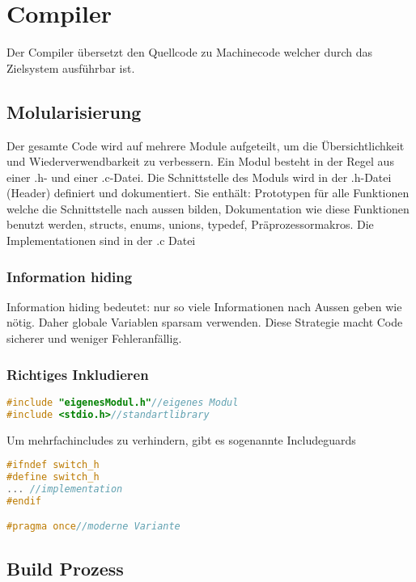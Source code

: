 \section{Compiler}
Der Compiler übersetzt den Quellcode zu Machinecode welcher durch das Zielsystem ausführbar ist.
\subsection{Molularisierung}

Der gesamte Code wird auf mehrere Module aufgeteilt, um die Übersichtlichkeit und Wiederverwendbarkeit zu verbessern. Ein Modul besteht in der Regel aus einer .h- und einer .c-Datei.\newline
Die Schnittstelle des Moduls wird in der .h-Datei (Header) definiert und dokumentiert. Sie enthält: Prototypen für alle Funktionen welche die Schnittstelle nach aussen bilden, Dokumentation wie diese Funktionen benutzt werden, structs, enums, unions, typedef, Präprozessormakros. Die Implementationen sind in der .c Datei

\subsubsection{Information hiding}

Information hiding bedeutet: nur so viele Informationen nach Aussen geben wie nötig. Daher globale Variablen sparsam verwenden. Diese Strategie macht Code sicherer und weniger Fehleranfällig.

\subsubsection{Richtiges Inkludieren}

\begin{lstlisting}[language = c]
#include "eigenesModul.h"//eigenes Modul
#include <stdio.h>//standartlibrary
\end{lstlisting}


Um mehrfachincludes zu verhindern, gibt es sogenannte Includeguards
\begin{lstlisting}[language = c]
#ifndef switch_h
#define switch_h
... //implementation
#endif

#pragma once//moderne Variante
\end{lstlisting}

\subsection{Build Prozess}

